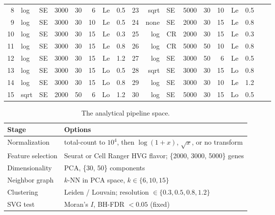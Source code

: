 \documentclass[conference]{IEEEtran}
\begin{document}
\begin{table}[t]
\begin{tabular}{@{}rlllrrrlr@{\hspace{14pt}}rlllrrrlr@{}}
    8 & log & SE & 3000 & 30 & 6 & Le & 0.5 & 23 & sqrt & SE & 5000 & 30 & 10 & Le & 0.5 \\
    9 & log & SE & 3000 & 30 & 10 & Le & 0.5 & 24 & none & SE & 2000 & 30 & 15 & Le & 0.8 \\
    10 & log & SE & 3000 & 30 & 15 & Le & 0.3 & 25 & log & CR & 2000 & 30 & 15 & Le & 0.3 \\
    11 & log & SE & 3000 & 30 & 15 & Le & 0.8 & 26 & log & CR & 5000 & 50 & 10 & Le & 0.8 \\
    12 & log & SE & 3000 & 30 & 15 & Le & 1.2 & 27 & log & SE & 3000 & 50 & 6 & Le & 0.5 \\
    13 & log & SE & 3000 & 30 & 15 & Lo & 0.5 & 28 & sqrt & SE & 3000 & 30 & 15 & Lo & 0.8 \\
    14 & log & SE & 3000 & 30 & 15 & Lo & 0.8 & 29 & log & SE & 3000 & 30 & 10 & Le & 1.2 \\
    15 & sqrt & SE & 2000 & 50 & 6 & Lo & 1.2 & 30 & log & SE & 5000 & 30 & 15 & Lo & 0.5 \\
    \bottomrule
  \end{tabular}
\end{table}


\begin{table}[t]
  \centering
  \caption{The analytical pipeline space.}
  \label{tab:space}
  \footnotesize
  \setlength{\tabcolsep}{4pt}
  \begin{tabular}{@{}p{}p{}@{}}
    \toprule
    Stage & Options \\
    \midrule
    Normalization & total-count to $10^4$, then $\log(1+x)$, $\sqrt{x}$, or no transform \\
    Feature selection & Seurat or Cell Ranger HVG flavor; \{2000, 3000, 5000\} genes \\
    Dimensionality & PCA, \{30, 50\} components \\
    Neighbor graph & $k$-NN in PCA space, $k \in \{6, 10, 15\}$ \\
    Clustering & Leiden / Louvain; resolution $\in \{0.3,0.5,0.8,1.2\}$ \\
    SVG test & Moran's $I$, BH-FDR $<0.05$ (fixed) \\
    \bottomrule
  \end{tabular}
\end{table}
\end{document}
